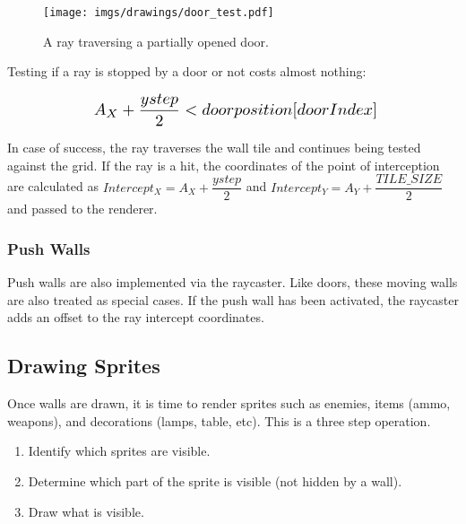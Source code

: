 \begin{minipage}{\textwidth}

\end{minipage}

\par 
 \par
\begin{figure}[H]
  \centering
 \texttt{[image: imgs/drawings/door\_test.pdf]}
 \caption{A ray traversing a partially opened door.}
\end{figure}
\par
Testing if a ray is stopped by a door or not costs almost nothing:\\
\par

\begin{equation*}
    \scalebox{1.3}{
$A_{X} + \dfrac{ystep}{2} < doorposition[doorIndex]$\\
}
\end{equation*}
\par
 In case of success, the ray traverses the wall tile and continues being tested against the grid. If the ray is a hit, the coordinates of the point of interception are calculated as $Intercept_{X} = A_{X} + \dfrac{ystep}{2}$ and $Intercept_{Y} = A_{Y} + \dfrac{TILE\_SIZE}{2}$ and passed to the renderer.












\subsubsection{Push Walls} 
Push walls are also implemented via the raycaster. Like doors, these moving walls are also treated as special cases. If the push wall has been activated, the raycaster adds an offset to the ray intercept coordinates.

















\subsection{Drawing Sprites}
\label{drawingSprites}
Once walls are drawn, it is time to render sprites such as enemies, items (ammo, weapons), and decorations (lamps, table, etc). This is a three step operation.
 \begin{enumerate}
  \item Identify which sprites are visible.
  \item Determine which part of the sprite is visible (not hidden by a wall).
  \item Draw what is visible.
 \end{enumerate}



